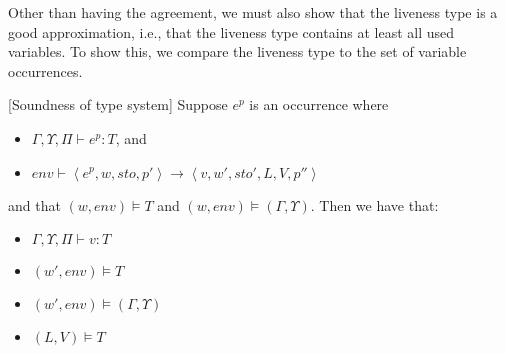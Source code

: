 \documentclass[../../master.tex]{subfiles}
\begin{document}
Other than having the agreement, we must also show that the liveness type is a good approximation, i.e., that the liveness type contains at least all used variables.
To show this, we compare the liveness type to the set of variable occurrences.


\begin{theorem}{[Soundness of type system]}
	Suppose $e^p$ is an occurrence where
	\begin{itemize}
		\item $\Gamma,\Upsilon,\Pi\vdash e^p : T$, and 
		\item $env\vdash\left\langle e^p,w,sto,p'\right\rangle\rightarrow\left\langle v,w',sto',L,V,p''\right\rangle$
	\end{itemize}
	and that $(w,env)\models T$ and $(w,env)\models(\Gamma,\Upsilon)$.
	Then we have that:
	\begin{itemize}
		\item $\Gamma,\Upsilon,\Pi\vdash v : T$
		\item $(w',env)\models T$
		\item $(w',env)\models(\Gamma,\Upsilon)$
		\item $(L,V)\models T$
	\end{itemize}
\end{theorem}
\end{document}
